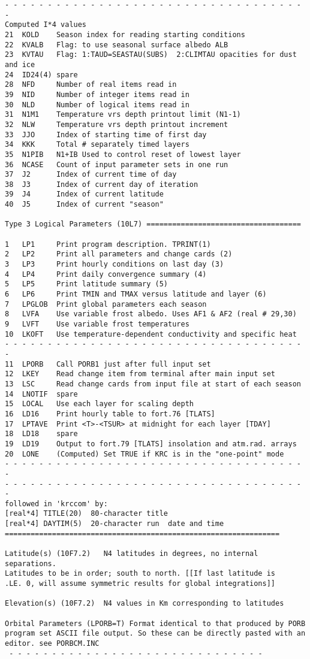 \documentclass[draft]{article}  %
\begin{document}
\begin{verbatim}
- - - - - - - - - - - - - - - - - - - - - - - - - - - - - - - - - - - - 
Computed I*4 values
21  KOLD    Season index for reading starting conditions
22  KVALB   Flag: to use seasonal surface albedo ALB
23  KVTAU   Flag: 1:TAUD=SEASTAU(SUBS)  2:CLIMTAU opacities for dust and ice
24  ID24(4) spare
28  NFD     Number of real items read in
39  NID     Number of integer items read in
30  NLD     Number of logical items read in
31  N1M1    Temperature vrs depth printout limit (N1-1)
32  NLW     Temperature vrs depth printout increment
33  JJO     Index of starting time of first day
34  KKK     Total # separately timed layers
35  N1PIB   N1+IB Used to control reset of lowest layer
36  NCASE   Count of input parameter sets in one run
37  J2      Index of current time of day
38  J3      Index of current day of iteration
39  J4      Index of current latitude
40  J5      Index of current "season"

Type 3 Logical Parameters (10L7) ====================================

1   LP1     Print program description. TPRINT(1) 
2   LP2     Print all parameters and change cards (2)
3   LP3     Print hourly conditions on last day (3)
4   LP4     Print daily convergence summary (4)
5   LP5     Print latitude summary (5)
6   LP6     Print TMIN and TMAX versus latitude and layer (6)
7   LPGLOB  Print global parameters each season
8   LVFA    Use variable frost albedo. Uses AF1 & AF2 (real # 29,30)
9   LVFT    Use variable frost temperatures
10  LKOFT   Use temperature-dependent conductivity and specific heat
- - - - - - - - - - - - - - - - - - - - - - - - - - - - - - - - - - - - 
11  LPORB   Call PORB1 just after full input set
12  LKEY    Read change item from terminal after main input set
13  LSC     Read change cards from input file at start of each season
14  LNOTIF  spare
15  LOCAL   Use each layer for scaling depth
16  LD16    Print hourly table to fort.76 [TLATS] 
17  LPTAVE  Print <T>-<TSUR> at midnight for each layer [TDAY]
18  LD18    spare
19  LD19    Output to fort.79 [TLATS] insolation and atm.rad. arrays 
20  LONE    (Computed) Set TRUE if KRC is in the "one-point" mode
- - - - - - - - - - - - - - - - - - - - - - - - - - - - - - - - - - - - 
- - - - - - - - - - - - - - - - - - - - - - - - - - - - - - - - - - - - 
followed in 'krccom' by: 
[real*4] TITLE(20)	80-character title
[real*4] DAYTIM(5)	20-character run  date and time
================================================================

Latitude(s) (10F7.2)   N4 latitudes in degrees, no internal separations.
Latitudes to be in order; south to north. [[If last latitude is
.LE. 0, will assume symmetric results for global integrations]]

Elevation(s) (10F7.2)  N4 values in Km corresponding to latitudes

Orbital Parameters (LPORB=T) Format identical to that produced by PORB
program set ASCII file output. So these can be directly pasted with an
editor. see PORBCM.INC
 - - - - - - - - - - - - - - - - - - - - - - - - - - - - - - 
\end{verbatim}
\end{document}
